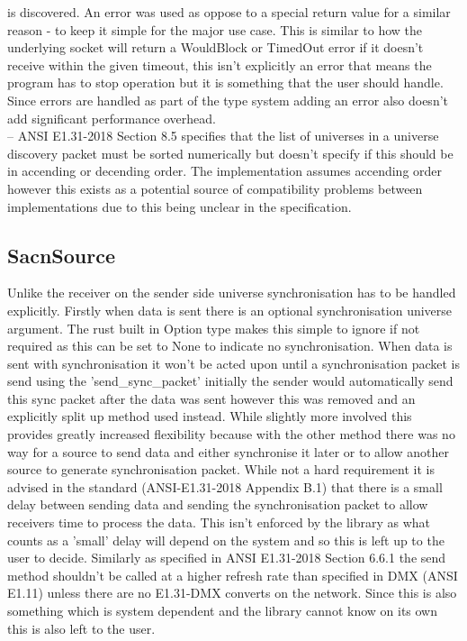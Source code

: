\documentclass[11pt,a4paper]{article}
\begin{document}
is discovered. An error was used as oppose to a special return value for a similar reason - to keep it simple for the major use case. This is similar to how the underlying socket will return a WouldBlock or TimedOut error if it doesn't receive within the given timeout, this isn't explicitly an error that means the program has to stop operation but it is something that the user should handle. Since errors are handled as part of the type system adding an error also doesn't add significant performance overhead. \\

-- ANSI E1.31-2018 Section 8.5 specifies that the list of universes in a universe discovery packet must be sorted numerically but doesn't specify if this should be in accending or decending order. The implementation assumes accending order however this exists as a potential source of compatibility problems between implementations due to this being unclear in the specification.


\subsection{SacnSource}
Unlike the receiver on the sender side universe synchronisation has to be handled explicitly. Firstly when data is sent there is an optional synchronisation universe argument. The rust built in Option type makes this simple to ignore if not required as this can be set to None to indicate no synchronisation. When data is sent with synchronisation it won't be acted upon until a synchronisation packet is send using the 'send\_sync\_packet' initially the sender would automatically send this sync packet after the data was sent however this was removed and an explicitly split up method used instead. While slightly more involved this provides greatly increased flexibility because with the other method there was no way for a source to send data and either synchronise it later or to allow another source to generate synchronisation packet. While not a hard requirement it is advised in the standard (ANSI-E1.31-2018 Appendix B.1) that there is a small delay between sending data and sending the synchronisation packet to allow receivers time to process the data. This isn't enforced by the library as what counts as a 'small' delay will depend on the system and so this is left up to the user to decide. Similarly as specified in ANSI E1.31-2018 Section 6.6.1 the send method shouldn't be called at a higher refresh rate than specified in DMX (ANSI E1.11) unless there are no E1.31-DMX converts on the network. Since this is also something which is system dependent and the library cannot know on its own this is also left to the user.\\
\end{document}
